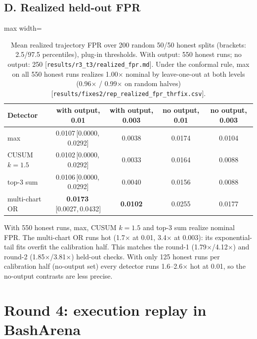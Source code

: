 \documentclass[11pt]{article}
\newcommand{\src}[1]{{\footnotesize\textcolor{ink2}{[\nolinkurl{#1}]}}}
\newcommand{\ci}[2]{\,[#1,\,#2]}
\begin{document}
\subsection{D. Realized held-out FPR}
\begin{table}[H]\centering\small
\begin{adjustbox}{max width=\linewidth}
\begin{tabular}{@{}lcccc@{}}
\toprule
Detector & with output, 0.01 & with output, 0.003 & no output, 0.01 & no output, 0.003\\
\midrule
max & 0.0107\ci{0.0000}{0.0292} & 0.0038 & 0.0174 & 0.0104\\
CUSUM $k{=}1.5$ & 0.0102\ci{0.0000}{0.0292} & 0.0033 & 0.0164 & 0.0088\\
top-3 sum & 0.0106\ci{0.0000}{0.0292} & 0.0040 & 0.0156 & 0.0088\\
multi-chart OR & \textbf{0.0173}\ci{0.0027}{0.0432} & \textbf{0.0102} & 0.0255 & 0.0177\\
\bottomrule
\end{tabular}
\end{adjustbox}
\caption{Mean realized trajectory FPR over 200 random 50/50 honest splits (brackets: 2.5/97.5 percentiles), plug-in thresholds. With output: 550 honest runs; no output: 250 \src{results/r3_t3/realized_fpr.md}. Under the conformal rule, max on all 550 honest runs realizes 1.00$\times$ nominal by leave-one-out at both levels (0.96$\times$ / 0.99$\times$ on random halves) \src{results/fixes2/rep_realized_fpr_thrfix.csv}.}\label{tab:fpr}
\end{table}
With 550 honest runs, max, CUSUM $k=1.5$ and top-3 sum realize nominal FPR. The multi-chart OR runs hot (1.7$\times$ at 0.01, 3.4$\times$ at 0.003): its exponential-tail fits overfit the calibration half. This matches the round-1 (1.79$\times$/4.12$\times$) and round-2 (1.85$\times$/3.81$\times$) held-out checks. With only 125 honest runs per calibration half (no-output set) every detector runs 1.6--2.6$\times$ hot at 0.01, so the no-output contrasts are less precise.

\section{Round 4: execution replay in BashArena}\label{sec:r4}
\end{document}
